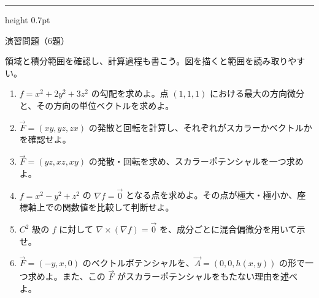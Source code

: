 \documentclass[a4paper,10pt,pdflatex,ja=standard,jafont=ipaex-type1,
  magstyle=real,scale=1]{bxjsarticle}
\newcommand{\topic}[1]{\par\vspace{5pt}%
  {\large\sffamily\mdseries\color{accent}#1}\par\vspace{2pt}}
\newenvironment{problems}
  {\begin{enumerate}[leftmargin=2em,itemsep=3pt,topsep=3pt,parsep=0pt,
    font=\color{accent}]}
  {\end{enumerate}}
\newcommand{\problemspace}{\par\vspace{5mm}}
\newcommand{\exercises}{%
  {\color{accent}\hrule height 0.7pt}\vspace{3pt}%
  \topic{演習問題（6題）}%
  {\small 領域と積分範囲を確認し、計算過程も書こう。図を描くと範囲を読み取りやすい。}\par}
\begin{document}
\noindent\begin{minipage}[b][0.5\textheight][t]{\linewidth}
\exercises
\begin{problems}
\item $f=x^2+2y^2+3z^2$ の勾配を求めよ。点 $(1,1,1)$ における最大の方向微分と、その方向の単位ベクトルを求めよ。
\problemspace

\item $\vec F=(xy,yz,zx)$ の発散と回転を計算し、それぞれがスカラーかベクトルかを確認せよ。
\problemspace

\item $\vec F=(yz,xz,xy)$ の発散・回転を求め、スカラーポテンシャルを一つ求めよ。
\problemspace

\item $f=x^2-y^2+z^2$ の $\nabla f=\vec0$ となる点を求めよ。その点が極大・極小か、座標軸上での関数値を比較して判断せよ。
\problemspace

\item $C^2$ 級の $f$ に対して $\nabla\times(\nabla f)=\vec0$ を、成分ごとに混合偏微分を用いて示せ。
\problemspace

\item $\vec F=(-y,x,0)$ のベクトルポテンシャルを、$\vec A=(0,0,h(x,y))$ の形で一つ求めよ。また、この $\vec F$ がスカラーポテンシャルをもたない理由を述べよ。
\problemspace
\end{problems}
\end{minipage}
\end{document}
